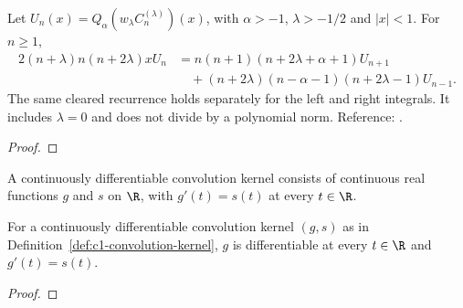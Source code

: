 \begin{supporting}
\begin{theorem}
\label{thm:power-law-mode-recurrence}
\leanok
Let $U_n(x)=Q_\alpha(w_\lambda C_n^{(\lambda)})(x)$, with
$\alpha>-1$, $\lambda>-1/2$ and $|x|<1$. For $n\ge1$,
\begin{align*}
 2(n+\lambda)n(n+2\lambda)xU_n
 &=n(n+1)(n+2\lambda+\alpha+1)U_{n+1}\\
 &\quad +(n+2\lambda)(n-\alpha-1)(n+2\lambda-1)U_{n-1}.
\end{align*}
The same cleared recurrence holds separately for the left and right integrals.
It includes $\lambda=0$ and does not divide by a polynomial norm.
Reference: \cite[Lemma 2.2 and Theorem 2.4]{gutleb-carrillo-olver}.
\end{theorem}
\begin{proof}
\leanok
\end{proof}

\begin{definition}
\label{def:c1-convolution-kernel}
\leanok
A continuously differentiable convolution kernel consists of continuous real
functions $g$ and $s$ on $\R$, with $g'(t)=s(t)$ at every $t\in\R$.
\end{definition}
\begin{theorem}
\label{thm:c1-convolution-kernel}
\leanok
For a continuously differentiable convolution kernel $(g,s)$ as in
Definition~\ref{def:c1-convolution-kernel}, $g$ is differentiable at every
$t\in\R$ and $g'(t)=s(t)$.
\end{theorem}
\begin{proof}
\leanok
\end{proof}


\end{supporting}
